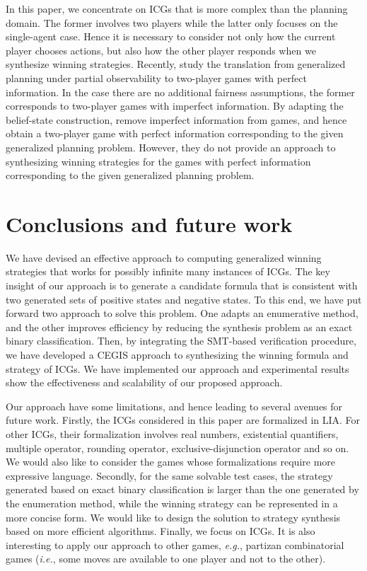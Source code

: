 \documentclass[review]{elsarticle}
\newcommand\ie{{\it i.e.}}
\newcommand\eg{{\it e.g.}}
\begin{document}
In this paper, we concentrate on ICGs that is more complex than the planning domain. The former involves two players while the latter only focuses on the single-agent case. Hence it is necessary to consider not only how the current player chooses actions, but also how the other player responds when we synthesize winning strategies.
Recently, \citet{GiacomoMRS2016} study the translation from generalized planning under partial observability to two-player games with perfect information. In the case there are no additional fairness assumptions, the former corresponds to two-player games with imperfect information.
By adapting the belief-state construction, \citeauthor{GiacomoMRS2016} remove imperfect information from games, and hence obtain a two-player game with perfect information corresponding to the given generalized planning problem. However, they do not provide an approach to synthesizing winning strategies for the games with perfect information corresponding to the given generalized planning problem.


\section{Conclusions and future work}
	We have devised an effective approach to computing generalized winning strategies that works for possibly infinite many instances of ICGs. The key insight of our approach is to generate a candidate formula that is consistent with two generated sets of positive states and negative states. To this end, we have put forward two approach to solve this problem.
	One adapts an enumerative method, and the other improves efficiency by reducing the synthesis problem as an exact binary classification. Then, by integrating the SMT-based verification procedure, we have developed a CEGIS approach to synthesizing the winning formula and strategy of ICGs. We have implemented our approach and experimental results show the effectiveness and scalability of our proposed approach.

    Our approach have some limitations, and hence leading to several avenues for future work.
    Firstly, the ICGs considered in this paper are formalized in LIA.
    For other ICGs, their formalization involves real numbers, existential quantifiers, multiple operator, rounding operator, exclusive-disjunction operator and so on.
    We would also like to consider the games whose formalizations require more expressive language.
    Secondly, for the same solvable test cases, the strategy generated based on exact binary classification is larger than the one generated by the enumeration method, while the winning strategy can be represented in a more concise form.
    We would like to design the solution to strategy synthesis based on more efficient algorithms.
    Finally, we focus on ICGs.
    It is also interesting to apply our approach to other games, \eg, partizan combinatorial games (\ie, some moves are available to one player and not to the other).
\end{document}

